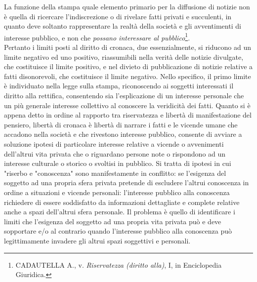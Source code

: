 La funzione della stampa quale elemento primario per la diffusione di notizie non è quella di ricercare l'indiscrezione o di rivelare fatti privati e succulenti, in quanto deve soltanto rappresentare la realtà della società e gli avventimenti di interesse pubblico, e non che \textit{possano interessare al pubblico}\footnote{CADAUTELLA A., v. \textit{Riservatezza (diritto alla)}, I, in Enciclopedia Giuridica.}. 
\\Pertanto i limiti posti al diritto di cronaca, due essenzialmente, si riducono ad un limite negativo ed uno positivo, riassumibili nella verità delle notizie divulgate, che costituisce il limite positivo, e nel divieto di pubblicazione di notizie relative a fatti disonorevoli, che costituisce il limite negativo.
Nello specifico, il primo limite è individuato nella legge sulla stampa, riconoscendo ai soggetti interessati il diritto alla rettifica, consentendo sia l'esplicazione di un interesse personale che un più generale interesse collettivo al conoscere la veridicità dei fatti.
Quanto si è appena detto in ordine al rapporto tra riservatezza e libertà di manifestazione del pensiero, libertà di cronaca è libertà di narrare i fatti e le vicende umane che accadono nella società e che rivestono interesse pubblico, consente di avviare a soluzione ipotesi di particolare interesse relative a vicende o avvenimenti dell'altrui vita privata che o riguardano persone note o rispondono ad un interesse culturale o storico o svoltisi in pubblico. 
Si tratta di ipotesi in cui "riserbo e "conoscenza" sono manifestamente in conflitto: se l'esigenza del soggetto ad una propria sfera privata pretende di escludere l'altrui conoscenza in ordine a situazioni e vicende personali: l'interesse pubblico alla conoscenza richiedere di essere soddisfatto da informazioni dettagliate e complete relative anche a spazi dell'altrui sfera personale. 
Il problema è quello di identificare i limiti che l'esigenza del soggetto ad una propria vita privata può e deve sopportare e/o al contrario quando l'interesse pubblico alla conoscenza può legittimamente invadere gli altrui spazi soggettivi e personali.

